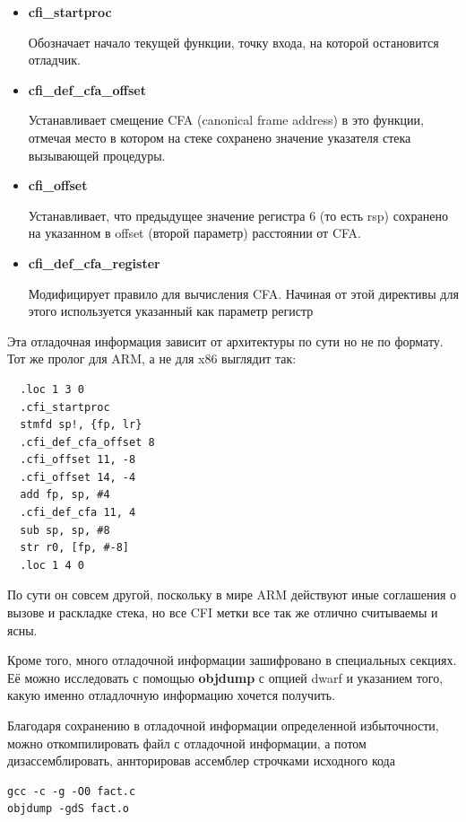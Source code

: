 \documentclass[a4paper,12pt,oneside]{article}
\begin{document}
\begin{itemize}
\item \textbf{cfi\_startproc}

Обозначает начало текущей функции, точку входа, на которой остановится отладчик.

\item \textbf{cfi\_def\_cfa\_offset}

Устанавливает смещение CFA (canonical frame address) в это функции, отмечая место в котором на стеке сохранено значение указателя стека вызывающей процедуры.

\item \textbf{cfi\_offset}

Устанавливает, что предыдущее значение регистра 6 (то есть rsp) сохранено на указанном в offset (второй параметр) расстоянии от CFA.

\item \textbf{cfi\_def\_cfa\_register}

Модифицирует правило для вычисления CFA. Начиная от этой директивы для этого используется указанный как параметр регистр
\end{itemize}

Эта отладочная информация зависит от архитектуры по сути но не по формату. Тот же пролог для ARM, а не для x86 выглядит так:

\begin{verbatim}
  .loc 1 3 0
  .cfi_startproc
  stmfd sp!, {fp, lr}
  .cfi_def_cfa_offset 8
  .cfi_offset 11, -8
  .cfi_offset 14, -4
  add fp, sp, #4
  .cfi_def_cfa 11, 4
  sub sp, sp, #8
  str r0, [fp, #-8]
  .loc 1 4 0
\end{verbatim}

По сути он совсем другой, поскольку в мире ARM действуют иные соглашения о вызове и раскладке стека, но все CFI метки все так же отлично считываемы и ясны.

Кроме того, много отладочной информации зашифровано в  специальных секциях. Её можно исследовать с помощью \textbf{objdump} с опцией dwarf и указанием того, какую именно отладлочную информацию хочется получить.

Благодаря сохранению в отладочной информации определенной избыточности, можно откомпилировать файл с отладочной информации, а потом дизассемблировать, аннторировав ассемблер строчками исходного кода

\begin{verbatim}
gcc -c -g -O0 fact.c
objdump -gdS fact.o
\end{verbatim}
\end{document}
